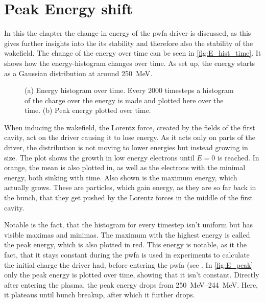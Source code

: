 \documentclass[bachelor_thesis]{subfiles}
\begin{document}

\section{Peak Energy shift}
In this the chapter the change in energy of the \gls{pwfa} driver is discussed, as this gives further insights into the its stability and therefore also the stability of the wakefield.
The change of the energy over time can be seen in \autoref{fig:E_hist_time}. It shows how the energy-histogram changes over time. As set up, the energy starts as a Gaussian distribution at around \qty{250}{\MeV}.
\begin{figure}
	\centering
	\begin{subfigure}{0.5\textwidth}
	\centering
	\missingfigure{}
	\caption{} \label{fig:E_hist_time}
	\end{subfigure}
	\hfill
	\begin{subfigure}{0.5\textwidth}
	\centering
	\missingfigure{}
	\caption{} \label{fig:E_peak}
	\end{subfigure}
	\caption{(a) Energy histogram over time. Every 2000 timesteps a histogram of the charge over the energy is made and plotted here over the time.
	(b) Peak energy plotted over time.}
	\label{fig:Energy}
\end{figure}
When inducing the wakefield, the Lorentz force, created by the fields of the first cavity, act on the driver causing it to lose energy. As it acts only on parts of the driver, the distribution is not moving to lower energies but instead growing in size.
The plot shows the growth in low energy electrons until $E=0$ is reached. In orange, the mean is also plotted in,  as well as the electrons with the minimal energy, both sinking with time. Also shown is the maximum energy, which actually grows.
These are particles, which gain energy, as they are so far back in the bunch, that they get pushed by the Lorentz forces in the middle of the first cavity.

Notable is the fact, that the histogram for every timestep isn't uniform but has visible maximas and minimas. The maximum with the highest energy is called the peak energy, which is also plotted in red.
This energy is notable, as it the fact, that it stays constant during the \gls{pwfa} is used in experiments to calculate the initial charge the driver had, before entering the \gls{pwfa} (see \cite{Schoebel2022}.
In \autoref{fig:E_peak} only the peak energy is plotted over time, showing that it isn't constant. Directly after entering the plasma, the peak energy drops from \qtyrange{250}{244}{\MeV}.
Here, it plateaus until bunch breakup, after which it further drops.
\end{document}

